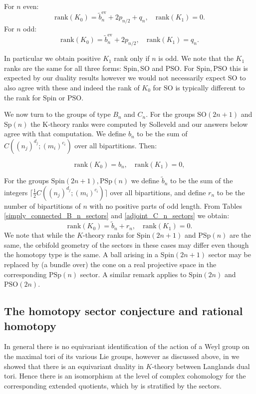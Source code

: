 \documentclass[11pt,a4paper]{article}
\def\Spin{\mathrm{Spin}}
\def\SO{\mathrm{SO}}
\def\PSO{\mathrm{PSO}}
\def\Sp{\mathrm{Sp}}
\def\PSp{\mathrm{PSp}}
\def\ev{\mathrm{ev}}
\def\rank{\mathrm{rank}}
\begin{document}
\smallskip

\noindent For $n$ even:
\[
\rank(K_0)=\tilde b_n^\ev+2p_{n/2} + q_n,\quad \rank(K_1)=0.
\]
For $n$ odd:
\[
\rank(K_0)=\tilde b_n^\ev+2p_{n/2},\quad \rank(K_1)=q_n.
\]

\smallskip

In particular we obtain positive $K_1$ rank only if $n$ is odd. We note that the $K_1$ ranks are the same for all three forms: $\Spin, \SO$ and $\PSO$. For $\Spin,\PSO$ this is expected by our duality results however we would not necessarily expect $\SO$ to also agree with these and indeed the rank of $K_0$ for $\SO$ is typically different to the rank for $\Spin$ or $\PSO$.

\bigskip
We now turn to the groups of type $B_n$ and $C_n$. For the groups $\SO(2n+1)$ and $\Sp(n)$ the K-theory ranks were computed by Solleveld and our answers below agree with that computation. We define $b_n$ to be the sum of $C((n_j)^{d_j};(m_i)^{c_i})$ over all bipartitions. Then:

\smallskip

\[
\rank(K_0)= b_n, \quad \rank(K_1)=0,
\]

\smallskip

\noindent For the groups $\Spin(2n+1), \PSp(n)$ we define 
$\tilde b_n$ to be the sum of the integers $\lceil \frac 12 C((n_j)^{d_j};(m_i)^{c_i})\rceil$ over all bipartitions, and define  $r_n$ to be the number of bipartitions of $n$ with no positive parts of odd length. From Tables \ref{simply_connected_B_n_sectors} and \ref{adjoint_C_n_sectors} we obtain:
\[
\rank(K_0)= \tilde b_n + r_n, \quad \rank(K_1)=0.
\]
We note that while the $K$-theory ranks for $\Spin(2n+1)$ and $\PSp(n)$ are the same, the orbifold geometry of the sectors in these cases may differ even though the homotopy type is the same. A ball arising in a $\Spin(2n+1)$ sector may be replaced by (a bundle over) the cone on a real projective space in the corresponding $\PSp(n)$ sector. A similar remark applies to $\Spin(2n)$ and $\PSO(2n)$.



\subsection{The homotopy sector conjecture and rational homotopy}\label{sector conjecture}

In general there is no equivariant identification of the action of a Weyl group on the maximal tori of its various Lie groups, however as discussed above, in \cite{NPWKdual} we showed that there is an equivariant duality in $K$-theory between Langlands dual tori. Hence there is an isomorphism at the level of complex cohomology for the corresponding extended quotients, which by \cite{NPWAn} is stratified by the sectors.
\end{document}
